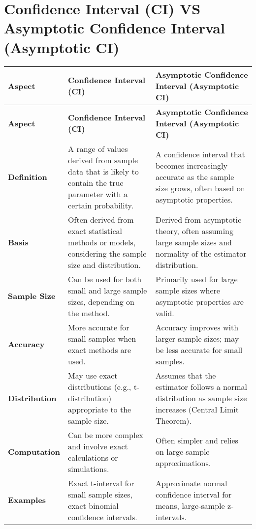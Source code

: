 \section{Confidence Interval (CI) VS Asymptotic Confidence Interval (Asymptotic CI) \cite{chatgpt}} \label{Confidence Interval (CI) VS Asymptotic Confidence Interval (Asymptotic CI)}

\begin{longtable}{|p{3cm}|p{6cm}|p{6cm}|}
    \hline
    \textbf{Aspect} & \textbf{Confidence Interval (CI)} & \textbf{Asymptotic Confidence Interval (Asymptotic CI)} \\
    \hline
    \endfirsthead
    
    \hline
    \textbf{Aspect} & \textbf{Confidence Interval (CI)} & \textbf{Asymptotic Confidence Interval (Asymptotic CI)} \\
    \hline
    \endhead
    
    \hline\endfoot
    
    \hline\endlastfoot
    
    \textbf{Definition} & A range of values derived from sample data that is likely to contain the true parameter with a certain probability. & A confidence interval that becomes increasingly accurate as the sample size grows, often based on asymptotic properties. \\
    \hline

    \textbf{Basis} & Often derived from exact statistical methods or models, considering the sample size and distribution. & Derived from asymptotic theory, often assuming large sample sizes and normality of the estimator distribution. \\
    \hline
    
    \textbf{Sample Size} & Can be used for both small and large sample sizes, depending on the method. & Primarily used for large sample sizes where asymptotic properties are valid. \\
    \hline
    
    \textbf{Accuracy} & More accurate for small samples when exact methods are used. & Accuracy improves with larger sample sizes; may be less accurate for small samples. \\
    \hline
    
    \textbf{Distribution} & May use exact distributions (e.g., t-distribution) appropriate to the sample size. & Assumes that the estimator follows a normal distribution as sample size increases (Central Limit Theorem). \\
    \hline
    
    \textbf{Computation} & Can be more complex and involve exact calculations or simulations. & Often simpler and relies on large-sample approximations. \\
    \hline
    
    \textbf{Examples} & Exact t-interval for small sample sizes, exact binomial confidence intervals. & Approximate normal confidence interval for means, large-sample z-intervals. \\
    \hline
\end{longtable}























